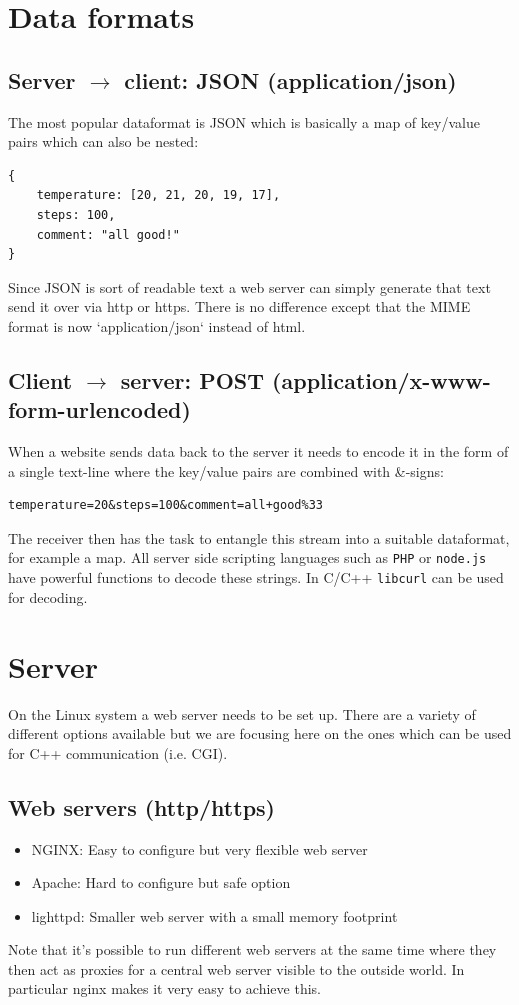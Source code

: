 \documentclass[12pt]{report}
\begin{document}
\section{Data formats}
\subsection{Server $\to$ client: JSON (application/json)}
The most popular dataformat is JSON which is basically a
map of key/value pairs which can also be nested:
\begin{verbatim}
{
    temperature: [20, 21, 20, 19, 17],
    steps: 100,
    comment: "all good!"
}
\end{verbatim}
Since JSON is sort of readable text a web server can simply
generate that text send it over via http or https. There
is no difference except that the MIME format is now `application/json`
instead of html.

\subsection{Client $\to$ server: POST (application/x-www-form-urlencoded)}
When a website sends data back to the server it needs to encode it in the
form of a single text-line where the key/value pairs are combined with \&-signs:
\begin{verbatim}
temperature=20&steps=100&comment=all+good%33
\end{verbatim}
The receiver then has the task to entangle this stream into a suitable dataformat,
for example a map. All server side scripting languages
such as \texttt{PHP} or \texttt{node.js} have powerful functions to
decode these strings. In C/C++ \texttt{libcurl}
can be used for decoding.


\section{Server}
On the Linux system a web server needs to be set up. There are
a variety of different options available but we are focusing here
on the ones which can be used for C++ communication (i.e. CGI).

\subsection{Web servers (http/https)}

\begin{itemize}
  \item NGINX: Easy to configure but very flexible web server
  \item Apache: Hard to configure but safe option
  \item lighttpd: Smaller web server with a small memory footprint
\end{itemize}
Note that it's possible to run different web servers at the
same time where they then act as proxies for a central web
server visible to the outside world. In particular nginx
makes it very easy to achieve this.
\end{document}
